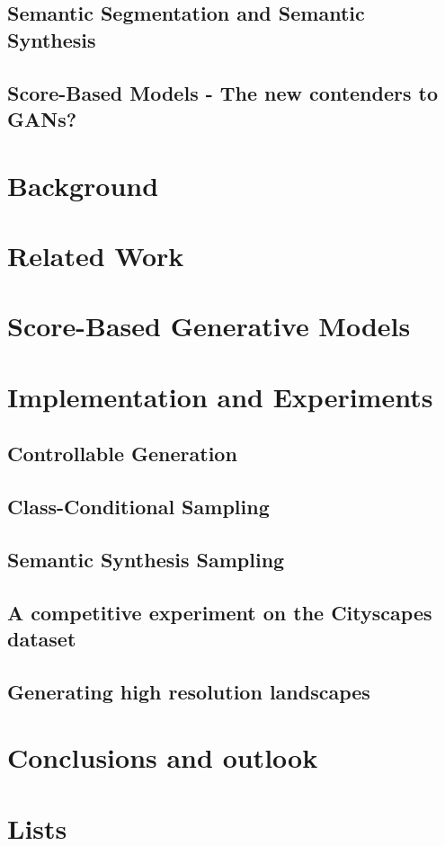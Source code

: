 \documentclass[a4paper, 12pt, oneside]{scrbook}
\begin{document}
\section{Semantic Segmentation and Semantic Synthesis} %
\section{Score-Based Models - The new contenders to GANs?} %

\chapter{Background}





\chapter{Related Work}



\chapter{Score-Based Generative Models} %





\chapter{Implementation and Experiments}
\section{Controllable Generation} %
\section{Class-Conditional Sampling} %
\section{Semantic Synthesis Sampling} %
\section{A competitive experiment on the Cityscapes dataset} %
\section{Generating high resolution landscapes} %

\chapter{Conclusions and outlook} %
\appendix 
\chapter{Lists}
\listoffigures
\listoftables

\listofalgorithms


\end{document}
